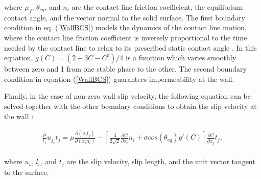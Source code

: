 \documentclass[review]{elsarticle}
\begin{document}
where $\mu_f$, $\theta_{eq}$, and $n_i$ are the contact line friction coefficient, the equilibrium contact angle, and the vector normal to the solid surface. The first boundary condition in eq. (\ref{WallBCS}) models the dynamics of the contact line motion, where the contact line friction coefficient is inversely proportional to the time needed by the contact line to relax to its prescribed static contact angle \citep{ Carlson2012,Xu2018}. In this equation, $g(C)=({2}+{3}{C}-{C}^3)/4 $ is a function which varies smoothly between zero and 1 from one stable phase to the other. The second boundary condition in equation (\ref{WallBCS}) guarantees impermeability at the wall.
  
Finally, in the case of non-zero wall slip velocity, the following  equation can be solved together with the other boundary conditions to obtain the  slip velocity at the wall \citep{ Carlson2012}:
\begin{linenomath}\begin{equation} \label{SlipVelocity}
\begin{gathered}
 \frac{\mu}{l_{s}}u_{j_{s}}t_j= \mu \frac{\partial (u_j  t_j)}{\partial (x_in_i)}- \left[ \frac{3}{2 \sqrt 2}\frac{\partial C}{\partial x_i}n_i + \sigma cos(\theta_{eq}) g'(C)\right]\frac{\partial C}{\partial x_j}t_j ,\\
 \end{gathered}
\end{equation}\end{linenomath}
where $u_{s}$, $l_{s}$, and $t_j $ are the slip velocity, slip length, and the unit vector tangent to the surface. 
\end{document}
